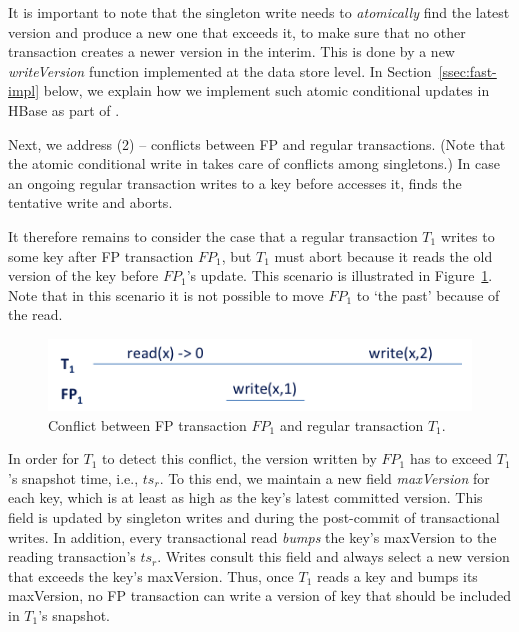 It is important to note that the singleton write needs to \emph{atomically} find the latest version and produce a new one that exceeds it, 
to make sure that no other transaction creates a newer version in the interim. This is done by a new \emph{writeVersion} function implemented 
at the data store level. In Section~\ref{ssec:fast-impl}
below, we explain how we implement such atomic conditional updates in HBase as part of \sys. 

Next, we address (2) -- conflicts between FP and regular transactions.
(Note that the atomic conditional write in  takes care of conflicts among singletons.)
In case an ongoing regular transaction writes to a key before  accesses it, 
 finds the tentative write and aborts. 

It therefore remains to consider the case that
a regular transaction $T_1$ writes to some key after FP transaction $FP_1$, but $T_1$ must abort because
it reads the old version of the key before $FP_1$'s update. This scenario is illustrated in Figure~\ref{fig:why-bump}. 
Note that in this scenario it is not possible to move $FP_1$ to `the past' because of the read.

\begin{figure}[htb]
\includegraphics[width=\columnwidth]{figs/FP-why-bump}
\caption{Conflict between FP transaction $FP_1$ and regular transaction $T_1$.}
\label{fig:why-bump}
\end{figure}

In order for $T_1$ to detect this 
conflict, the version written by $FP_1$ has to exceed $T_1$'s snapshot time, i.e., $ts_r$.
To this end, we maintain a new field \emph{maxVersion} for each key, which is at least as 
high as the key's latest committed version. 
This field is updated by singleton writes and during the post-commit of transactional writes.
In addition, every transactional read \emph{bumps} the key's {maxVersion}
to the reading transaction's $ts_r$. 
Writes consult this field and always select a new version that exceeds the key's {maxVersion}.
Thus, once $T_1$ reads a key and bumps its {maxVersion}, 
no FP transaction can write a version of key that should be 
included in $T_1$'s snapshot.

